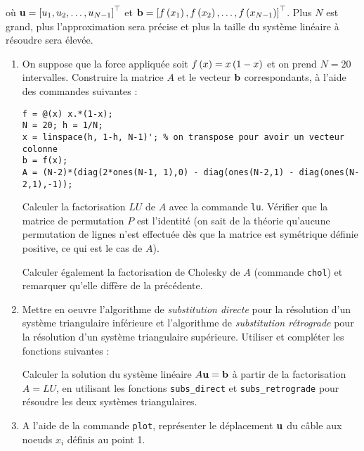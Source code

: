 où $\mathbf{u} = \left[u_{1}, u_{2}, \dots, u_{N-1}\right]^{\top}$ et $\mathbf{b} = \left[f \left(x_{1}\right), f \left(x_{2}\right), \dots, f \left(x_{N-1}\right)\right]^{\top}$.
Plus $N$ est grand, plus l'approximation sera précise et plus la taille du système linéaire à résoudre sera élevée.

\begin{enumerate}[label=\alph*)]
  \item On suppose que la force appliquée soit $f \left(x\right) = x \left(1 - x\right)$ et on prend $N = 20$ intervalles.
        Construire la matrice $A$ et le vecteur $\mathbf{b}$ correspondants, à l'aide des commandes suivantes :

\begin{verbatim}
f = @(x) x.*(1-x);
N = 20; h = 1/N;
x = linspace(h, 1-h, N-1)'; % on transpose pour avoir un vecteur colonne
b = f(x);
A = (N-2)*(diag(2*ones(N-1, 1),0) - diag(ones(N-2,1) - diag(ones(N-2,1),-1));
\end{verbatim}
        
        Calculer la factorisation $LU$ de $A$ avec la commande \MAT \texttt{lu}.
        Vérifier que la matrice de permutation $P$ est l'identité (on sait de la théorie qu'aucune permutation de lignes n'est effectuée dès que la matrice est symétrique définie positive, ce qui est le cas de $A$).
        
        Calculer également la factorisation de Cholesky de $A$ (commande \texttt{chol}) et remarquer qu'elle diffère de la précédente.
        
        
  \item Mettre en oeuvre l'algorithme de \textit{substitution directe} pour la résolution d'un système triangulaire inférieure et l'algorithme de \textit{substitution rétrograde} pour la résolution d'un système triangulaire supérieure. Utiliser et compléter les fonctions suivantes :
  
        

        
  
        Calculer la solution du système linéaire $A \mathbf{u} = \mathbf{b}$ à partir de la factorisation $A = LU$, en utilisant les fonctions \texttt{subs\_direct} et \texttt{subs\_retrograde} pour résoudre les deux systèmes triangulaires.
  
  
  \item A l'aide de la commande \texttt{plot}, représenter le déplacement $\mathbf{u}$ du câble aux noeuds $x_{i}$ définis au point 1.
  

\end{enumerate}
